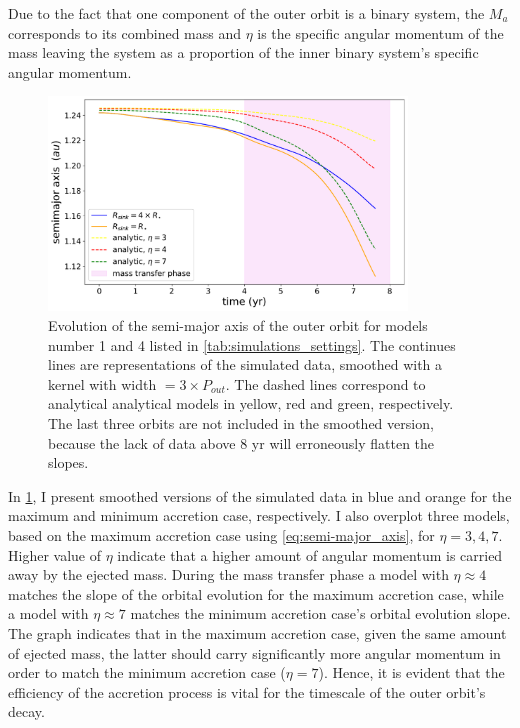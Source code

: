 Due to the fact that one component of the outer orbit is a binary system, the $M_a$ corresponds to its combined mass and $\eta$ is the specific angular momentum of the mass leaving the system as a proportion of the inner binary system's specific angular momentum. 
\begin{figure}[!htb]
    \centering
    \includegraphics[width=0.85\textwidth]{Thesis/graphs/analytical_model.pdf}
    \caption{Evolution of the semi-major axis of the outer orbit for models number 1 and 4 listed in \cref{tab:simulations_settings}. The continues lines are representations of the simulated data, smoothed with a kernel with width $= 3 \times P_{out}$. The dashed lines correspond to analytical analytical models in yellow, red and green, respectively.  The last three orbits are not included in the smoothed version, because the lack of data above $8$ yr will erroneously flatten the slopes.}
    \label{fig:comparison_analytical_model_max}
\end{figure}
In \cref{fig:comparison_analytical_model_max}, I present  smoothed versions of the simulated data in blue and orange for the maximum and minimum accretion case, respectively. I also overplot three models, based on the maximum accretion case using \cref{eq:semi-major_axis}, for $\eta = 3,4,7$. Higher value of $\eta$ indicate that a higher amount of angular momentum is carried away by the ejected mass. During the mass transfer phase a model with $\eta \approx 4$ matches the slope of the orbital evolution for the maximum accretion case, while a model with $\eta \approx 7$ matches the minimum accretion case's orbital evolution slope. The graph indicates that in the maximum accretion case, given the same amount of ejected mass, the latter should carry significantly more angular momentum in order to match the minimum accretion case ($\eta = 7$). Hence, it is evident that the efficiency of the accretion process is vital for the timescale of the outer orbit's decay.



